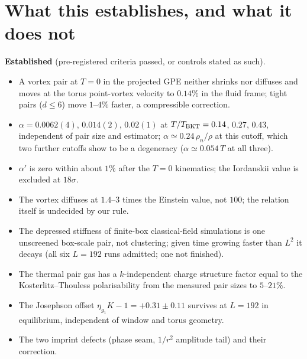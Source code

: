\documentclass[11pt,a4paper]{article}
\begin{document}
\section{What this establishes, and what it does not}\label{sec:conclusions}

\begin{keybox}
\textbf{Established} (pre-registered criteria passed, or controls stated as such).
\begin{itemize}[leftmargin=*]
\item A vortex pair at $T=0$ in the projected GPE neither shrinks nor diffuses and moves at the torus point-vortex
  velocity to $0.14\%$ in the fluid frame; tight pairs ($d\le6$) move $1$--$4\%$ faster, a compressible correction.
\item $\alpha=0.0062(4)$, $0.014(2)$, $0.02(1)$ at $T/T_{\rm BKT}=0.14$, $0.27$, $0.43$, independent of pair size and
  estimator; $\alpha\simeq0.24\,\rho_n/\rho$ at this cutoff, which two further cutoffs show to be a degeneracy ($\alpha\simeq0.054\,T$ at all three).
\item $\alpha'$ is zero within about $1\%$ after the $T=0$ kinematics; the Iordanskii value is excluded at $18\sigma$.
\item The vortex diffuses at $1.4$--$3$ times the Einstein value, not $100$; the relation itself is undecided by our rule.
\item The depressed stiffness of finite-box classical-field simulations is one unscreened box-scale pair, not
  clustering; given time growing faster than $L^2$ it decays (all six $L=192$ runs admitted; one not finished).
\item The thermal pair gas has a $k$-independent charge structure factor equal to the Kosterlitz--Thouless
  polarisability from the measured pair sizes to $5$--$21\%$.
\item The Josephson offset $\eta_{g_1}K-1=+0.31\pm0.11$ survives at $L=192$ in equilibrium, independent of window and
  torus geometry.
\item The two imprint defects (phase seam, $1/r^2$ amplitude tail) and their correction.
\end{itemize}
\end{keybox}
\end{document}
